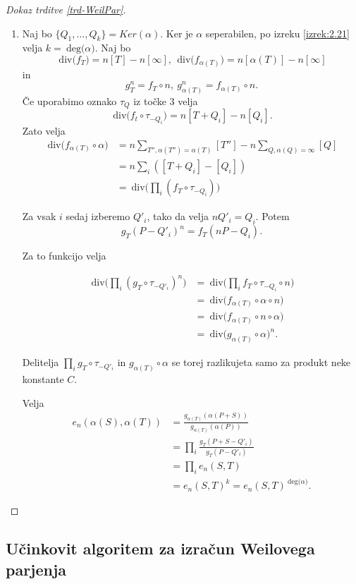 \documentclass[12pt,a4paper,twoside]{article}
\theoremstyle{definition} %
\theoremstyle{plain} %
\numberwithin{equation}{section}  %
\newcommand{\DEG}[1]{\ \text{deg(}{#1}\text{)}}
\newcommand{\Div}[1]{\ \text{div(}{#1}\text{)}}
\begin{document}
\begin{proof}[Dokaz trditve \ref{trd-WeilPar}]
\begin{enumerate}
\item Naj bo $\{Q_1,\ldots,Q_k\} = Ker(\alpha)$. Ker je $\alpha$ seperabilen, po izreku \ref{izrek:2.21} velja $k = \DEG{\alpha}$.
Naj bo
$$\Div{f_T} = n[T]-n[\infty],\ \Div{f_{\alpha(T)}} = n[\alpha(T)]-n[\infty]$$
in
$$g^n_T = f_T \circ n, \ g^n_{\alpha(T)} = f_{\alpha(T)} \circ n.$$
Če uporabimo oznako $\tau_Q$ iz točke $3$ velja
$$\Div{f_t \circ \tau_{-Q_i}} = n[T+Q_i]-n[Q_i].$$
Zato velja
\begin{align}
\Div{ f_{\alpha(T)} \circ \alpha} &{}= n \sum_{T'',\alpha(T'')=\alpha(T)}[T'']-n\sum_{Q,\alpha(Q)=\infty}[Q] \nonumber \\
&{} = n\sum_i ([T+Q_i]-[Q_i]) \nonumber \\
&{} = \Div{\prod_i(f_T \circ \tau_{-Q_i})} \nonumber
\end{align}

Za vsak $i$ sedaj izberemo $Q'_i$, tako da velja $nQ'_i = Q_i$. Potem
$$g_T(P-Q'_i)^n=f_T(nP-Q_i).$$

Za to funkcijo velja

\begin{align}
\Div{\prod_i(g_T \circ \tau_{-Q'_i})^n} &{} = \Div{\prod_i f_T \circ \tau_{-Q_i}\circ n} \nonumber \\
&{} = \Div{f_{\alpha(T)} \circ \alpha \circ n} \nonumber \\
&{} = \Div{f_{\alpha(T)} \circ n \circ \alpha} \nonumber \\
&{} = \Div{g_{\alpha(T)} \circ \alpha}^n. \nonumber
\end{align}

Delitelja $\prod_i g_T \circ \tau_{-Q'_i}$ in $g_{\alpha(T)} \circ \alpha$ se torej razlikujeta samo za produkt neke konstante $C$.

Velja
\begin{align}
e_n(\alpha(S),\alpha(T)) &{}= \frac{g_{\alpha(T)}(\alpha(P+S))}{g_{\alpha(T)}(\alpha(P))} \nonumber \\
&{} = \prod_i \frac{g_T(P+S-Q'_i)}{g_T(P-Q'_i)} \nonumber \\
&{} = \prod_i e_n(S,T) \nonumber  \\
&{} = e_n(S,T)^k = e_n(S,T)^{\DEG{\alpha}}. \nonumber
\end{align}

\end{enumerate}

\end{proof}

\subsection{Učinkovit algoritem za izračun Weilovega parjenja}
\end{document}
